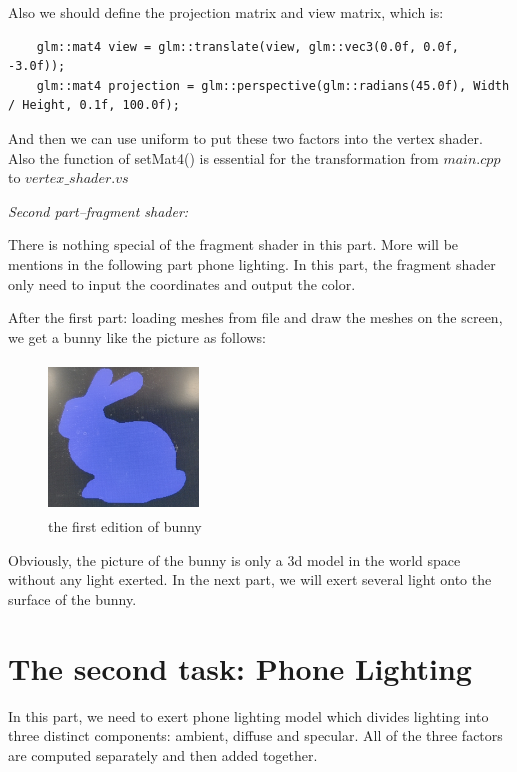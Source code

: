 \documentclass[acmtog]{acmart}
\begin{document}
Also we should define the projection matrix and view matrix, which is:

\begin{lstlisting}
	glm::mat4 view = glm::translate(view, glm::vec3(0.0f, 0.0f, -3.0f));
	glm::mat4 projection = glm::perspective(glm::radians(45.0f), Width / Height, 0.1f, 100.0f);
\end{lstlisting}

And then we can use uniform to put these two factors into the vertex shader. Also the function of setMat4() is essential for the transformation from $main.cpp$ to $vertex\_shader.vs$

\textcolor[rgb]{1,0,0}{\textit{Second part--fragment shader:}}

There is nothing special of the fragment shader in this part. More will be mentions in the following part phone lighting. In this part, the fragment shader only need to input the coordinates and output the color.

\clearpage

After the first part: loading meshes from file and draw the meshes on the screen, we get a bunny like the picture as follows:

\begin{figure}[h]
\includegraphics[width=4cm,height=4cm]{first_bunny}
\caption{the first edition of bunny}
\end{figure}

Obviously, the picture of the bunny is only a 3d model in the world space without any light exerted. In the next part, we will exert several light onto the surface of the bunny.

\section{The second task: Phone Lighting}

In this part, we need to exert phone lighting model which divides lighting into three distinct components: ambient, diffuse and specular. All of the three factors are computed separately and then added together.
\end{document}
